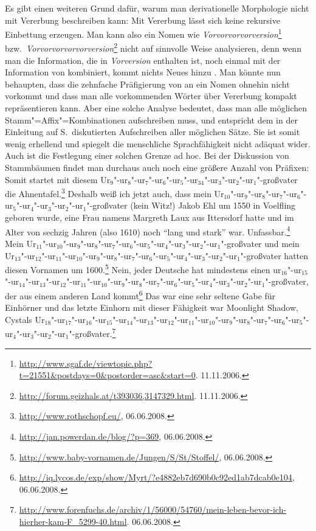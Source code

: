 Es gibt einen weiteren Grund dafür, warum man derivationelle Morphologie nicht mit Vererbung beschreiben kann:
Mit Vererbung lässt sich keine rekursive Einbettung erzeugen. Man kann also ein Nomen wie
\emph{Vorvorvorvorversion}\footnote{%
   \url{http://www.sgaf.de/viewtopic.php?t=21551&postdays=0&postorder=asc&start=0}. 11.11.2006.%
} bzw.\ \emph{Vorvorvorvorvorversion}\footnote{%
  \url{http://forum.geizhals.at/t393036,3147329.html}. 11.11.2006.%
}
nicht auf sinnvolle Weise analysieren, denn wenn man die Information, die in \emph{Vorversion} enthalten
ist, noch einmal mit der Information von  kombiniert, kommt nichts Neues hinzu
\citep[]{KN93a}.
Man könnte nun behaupten, dass die zehnfache Präfigierung von
 an ein Nomen ohnehin nicht vorkommt und dass man alle vorkommenden Wörter über Vererbung
kompakt repräsentieren kann. Aber eine solche Analyse bedeutet, dass
man alle möglichen Stamm"=Affix"=Kombinationen aufschreiben muss, und entspricht dem in der Einleitung 
auf S.\,\pageref{Seite-Alle-Sätze-aufschreiben}
diskutierten Aufschreiben aller möglichen Sätze. Sie ist somit wenig erhellend und spiegelt die
menschliche Sprachfähigkeit nicht adäquat wider. Auch ist die Festlegung einer solchen Grenze ad
hoc. Bei der Diskussion von Stammbäumen findet man durchaus auch noch eine größere Anzahl von
Präfixen:
\largerpage
\eal
\ex Somit startet mit diesem Ur$_9$"-ur$_8$"-ur$_7$"-ur$_6$"-ur$_5$"-ur$_34$"-ur$_3$"-ur$_2$"-ur$_1$"-großvater die Ahnentafel.\footnote{
  \url{http://www.rothschopf.eu/}, 06.06.2008.
}
\ex Deshalb weiß ich jetzt auch, dass mein Ur$_{10}$"-ur$_9$"-ur$_8$"-ur$_7$"-ur$_6$"-ur$_5$"-ur$_4$"-ur$_3$"-ur$_2$"-ur$_1$"-großvater (kein Witz!) Jakob Ehl um
1550 in Voelfling geboren wurde, eine Frau namens Margreth Laux aus Ittersdorf hatte und im Alter
von sechzig Jahren (also 1610) noch "`lang und stark"' war. Unfassbar.\footnote{
  \url{http://jan.powerdan.de/blog/?p=369}, 06.06.2008.
}
\ex Mein Ur$_{11}$"-ur$_{10}$"-ur$_9$"-ur$_8$"-ur$_7$"-ur$_6$"-ur$_5$"-ur$_4$"-ur$_3$"-ur$_2$"-ur$_1$"-großvater und mein Ur$_{13}$"-ur$_{12}$"-ur$_{11}$"-ur$_{10}$"-ur$_9$"-ur$_8$"-ur$_7$"-ur$_6$"-ur$_5$"-ur$_4$"-ur$_3$"-ur$_2$"-ur$_1$"-großvater hatten diesen
Vornamen um 1600.\footnote{
  \url{http://www.baby-vornamen.de/Jungen/S/St/Stoffel/}, 06.06.2008.
}
\ex Nein, jeder Deutsche hat mindestens einen
ur$_{16}$"-ur$_{15}$"-ur$_{14}$"-ur$_{13}$"-ur$_{12}$"-ur$_{11}$"-ur$_{10}$"-ur$_9$"-ur$_8$"-ur$_7$"-ur$_6$"-ur$_5$"-ur$_4$"-ur$_3$"-ur$_2$"-ur$_1$"-großvater,
der aus einem anderen Land kommt\footnote{
  \url{http://iq.lycos.de/exp/show/Myrt/?e4882eb7d690b0c92ed1ab7dcab0e104}, 06.06.2008.
}
\ex Das war eine sehr seltene Gabe für Einhörner und das letzte Einhorn mit dieser Fähigkeit war
Moonlight Shadow, Cystals Ur$_{18}$"-ur$_{17}$"-ur$_{16}$"-ur$_{15}$"-ur$_{14}$"-ur$_{13}$"-ur$_{12}$"-ur$_{11}$"-ur$_{10}$"-ur$_{9}$"-ur$_{8}$"-ur$_{7}$"-ur$_{6}$"-ur$_{5}$"-ur$_{4}$"-ur$_{3}$"-ur$_{2}$"-ur$_{1}$"-großvater.\footnote{
\url{http://www.forenfuchs.de/archiv/1/56000/54760/mein-leben-bevor-ich-hierher-kam-F_5299-40.html}.
06.06.2008.
}
\zl

